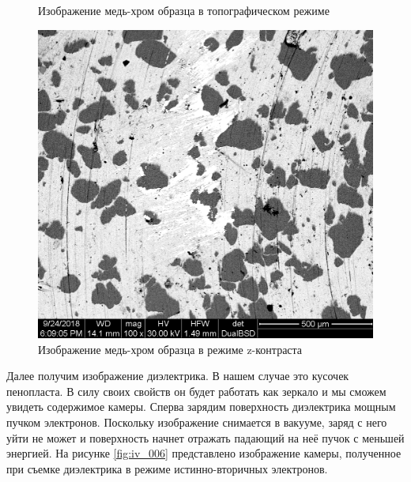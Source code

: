 \documentclass[a4paper, 12pt]{article}
\begin{document}
\begin{figure}[!htb]
		\caption{Изображение медь-хром образца в топографическом режиме}
		\label{fig:topo_004}
		\endminipage\hfill
		\includegraphics[width=\linewidth]{z_004.tif}
		\caption{Изображение медь-хром образца в режиме z-контраста}
		\label{fig:z_004}
		\endminipage
	\end{figure}
	Далее получим изображение диэлектрика. В нашем случае это кусочек пенопласта. В силу своих свойств он будет работать как зеркало и мы сможем увидеть содержимое камеры. Сперва зарядим поверхность диэлектрика мощным пучком электронов. Поскольку изображение снимается в вакууме, заряд с него уйти не может и поверхность начнет отражать падающий на неё пучок с меньшей энергией. На рисунке \ref{fig:iv_006} представлено изображение камеры, полученное при съемке диэлектрика в режиме истинно-вторичных электронов.
\end{document}
